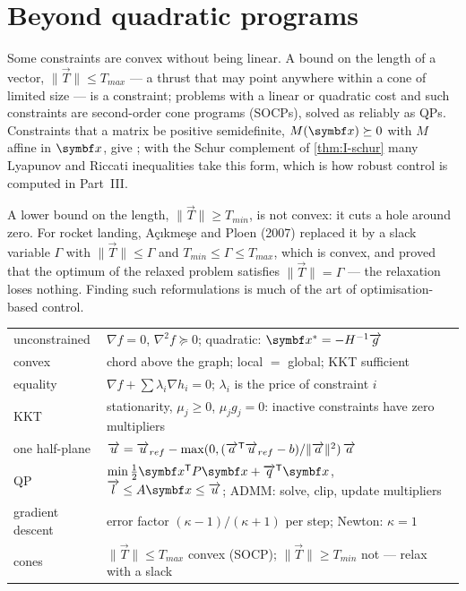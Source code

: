 \section{Beyond quadratic programs}

Some constraints are convex without being linear. A bound on the length of a vector, $\|\vec T\| \le T_{max}$ — a thrust that may point anywhere within a cone of limited size — is a  constraint; problems with a linear or quadratic cost and such constraints are second-order cone programs (SOCPs), solved as reliably as QPs. Constraints that a matrix be positive semidefinite, $M(\vx) \succeq 0$ with $M$ affine in $\vx$, give ; with the Schur complement of \cref{thm:I-schur} many Lyapunov and Riccati inequalities take this form, which is how robust control is computed in Part~III.

A lower bound on the length, $\|\vec T\| \ge T_{min}$, is not convex: it cuts a hole around zero. For rocket landing, Açıkmeşe and Ploen (2007) replaced it by a slack variable $\Gamma$ with $\|\vec T\| \le \Gamma$ and $T_{min} \le \Gamma \le T_{max}$, which is convex, and proved that the optimum of the relaxed problem satisfies $\|\vec T\| = \Gamma$ — the relaxation loses nothing. Finding such reformulations is much of the art of optimisation-based control.

\begin{result}
\begin{center}\small
\renewcommand{\arraystretch}{1.4}
\begin{tabularx}{\linewidth}{@{}l>{\raggedright\arraybackslash}X@{}}
unconstrained & $\nabla f = 0$, $\nabla^2f \succeq 0$; quadratic: $\vx^* = -H^{-1}\vec g$\\
convex & chord above the graph; local $=$ global; KKT sufficient\\
equality & $\nabla f + \sum\lambda_i\nabla h_i = 0$; $\lambda_i$ is the price of constraint $i$\\
KKT & stationarity, $\mu_j \ge 0$, $\mu_jg_j = 0$: inactive constraints have zero multipliers\\
one half-plane & $\overrightarrow{u} = \overrightarrow{u}_{ref} - \max(0, (\overrightarrow{a}^{\mathsf{T}}\overrightarrow{u}_{ref} - b)/\|\overrightarrow{a}\|^2)\,\overrightarrow{a}$\\
QP & $\min\tfrac12\vx^\T P\vx + \vec q^\T\vx$, $\vec l \le A\vx \le \vec u$; ADMM: solve, clip, update multipliers\\
gradient descent & error factor $(\kappa - 1)/(\kappa + 1)$ per step; Newton: $\kappa = 1$\\
cones & $\|\vec T\| \le T_{max}$ convex (SOCP); $\|\vec T\| \ge T_{min}$ not — relax with a slack\\
\end{tabularx}
\end{center}
\end{result}
